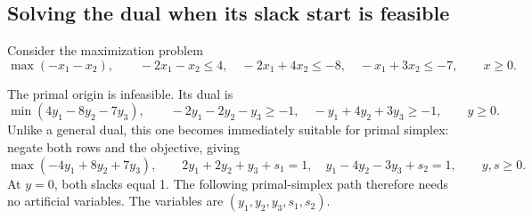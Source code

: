 \documentclass[11pt,a4paper]{article}
\begin{document}
\subsection{Solving the dual when its slack start is feasible}\label{sec:feasible-dual-start}
\begin{lecturecore}
  Consider the maximization problem
  \[
    \max(-x_1-x_2),\qquad
    -2x_1-x_2\leq4,\quad -2x_1+4x_2\leq-8,\quad
    -x_1+3x_2\leq-7,\qquad x\geq0.
  \]
\end{lecturecore}
The primal origin is infeasible. Its dual is
\[
  \min(4y_1-8y_2-7y_3),\qquad
  -2y_1-2y_2-y_3\geq-1,\quad -y_1+4y_2+3y_3\geq-1,
  \qquad y\geq0.
\]
Unlike a general dual, this one becomes immediately suitable for primal simplex:
negate both rows and the objective, giving
\[
  \max(-4y_1+8y_2+7y_3),\qquad
  2y_1+2y_2+y_3+s_1=1,\quad
  y_1-4y_2-3y_3+s_2=1,\qquad y,s\geq0.
\]
At $y=0$, both slacks equal 1. The following primal-simplex path therefore
needs no artificial variables. The variables are $(y_1,y_2,y_3,s_1,s_2)$.
\end{document}
